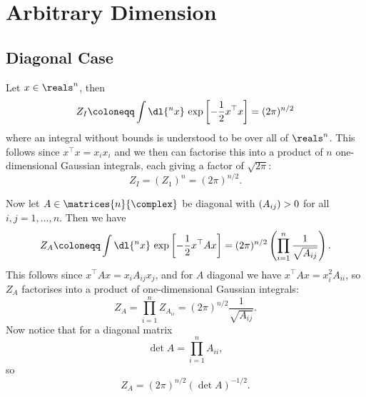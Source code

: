 \documentclass[fleqn]{NotesClass}
\let\Re\relax
\DeclareMathOperator{\Re}{Re}
\newcommand{\trans}{{\top}}
\begin{document}
    \section{Arbitrary Dimension}
    \subsection{Diagonal Case}
    Let \(x \in \reals^n\), then
    \begin{equation}
        Z_I \coloneqq \int \dl{^nx} \, \exp\left[ -\frac{1}{2}x^\trans x \right] = (2\pi)^{n/2}
    \end{equation}
    where an integral without bounds is understood to be over all of \(\reals^n\).
    This follows since \(x^\trans x = x_ix_i\) and we then can factorise this into a product of \(n\) one-dimensional Gaussian integrals, each giving a factor of \(\sqrt{2\pi}\):
    \begin{equation}
        Z_I = (Z_1)^n = (2\pi)^{n/2}.
    \end{equation}
    
    Now let \(A \in \matrices{n}{\complex}\) be diagonal with \(\Re(A_{ij}) > 0\) for all \(i, j = 1, \dotsc, n\).
    Then we have
    \begin{equation}
        Z_A \coloneqq \int \dl{^nx} \, \exp\left[ -\frac{1}{2}x^\trans A x \right] = (2\pi)^{n/2} \left( \prod_{i=1}^{n} \frac{1}{\sqrt{A_{ij}}} \right).
    \end{equation}
    This follows since \(x^\trans Ax = x_iA_{ij}x_j\), and for \(A\) diagonal we have \(x^\trans Ax = x_i^2A_{ii}\), so \(Z_A\) factorises into a product of one-dimensional Gaussian integrals:
    \begin{equation}
        Z_A = \prod_{i = 1}^{n} Z_{A_{ii}} = (2\pi)^{n/2} \frac{1}{\sqrt{A_{ij}}}.
    \end{equation}
    Now notice that for a diagonal matrix
    \begin{equation}
        \det A = \prod_{i = 1}^{n} A_{ii},
    \end{equation}
    so
    \begin{equation}
        Z_A = (2\pi)^{n/2} (\det A)^{-1/2}.
    \end{equation}
    
\end{document}
